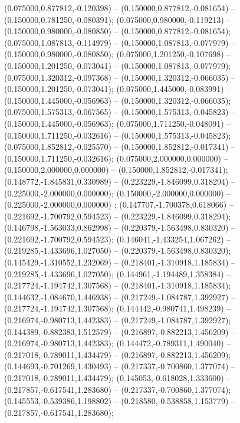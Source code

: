  (0.075000,0.877812,-0.120398) -- (0.150000,0.877812,-0.081654) -- (0.150000,0.781250,-0.080391);
 (0.075000,0.980000,-0.119213) -- (0.150000,0.980000,-0.080850) -- (0.150000,0.877812,-0.081654);
 (0.075000,1.087813,-0.114979) -- (0.150000,1.087813,-0.077979) -- (0.150000,0.980000,-0.080850);
 (0.075000,1.201250,-0.107698) -- (0.150000,1.201250,-0.073041) -- (0.150000,1.087813,-0.077979);
 (0.075000,1.320312,-0.097368) -- (0.150000,1.320312,-0.066035) -- (0.150000,1.201250,-0.073041);
 (0.075000,1.445000,-0.083991) -- (0.150000,1.445000,-0.056963) -- (0.150000,1.320312,-0.066035);
 (0.075000,1.575313,-0.067565) -- (0.150000,1.575313,-0.045823) -- (0.150000,1.445000,-0.056963);
 (0.075000,1.711250,-0.048091) -- (0.150000,1.711250,-0.032616) -- (0.150000,1.575313,-0.045823);
 (0.075000,1.852812,-0.025570) -- (0.150000,1.852812,-0.017341) -- (0.150000,1.711250,-0.032616);
 (0.075000,2.000000,0.000000) -- (0.150000,2.000000,0.000000) -- (0.150000,1.852812,-0.017341);
 (0.148772,-1.845831,0.330989) -- (0.223229,-1.846099,0.318294) -- (0.225000,-2.000000,0.000000);
 (0.150000,-2.000000,0.000000) -- (0.225000,-2.000000,0.000000) ;
 (0.147707,-1.700378,0.618066) -- (0.221692,-1.700792,0.594523) -- (0.223229,-1.846099,0.318294);
 (0.146798,-1.563033,0.862998) -- (0.220379,-1.563498,0.830320) -- (0.221692,-1.700792,0.594523);
 (0.146041,-1.433254,1.067262) -- (0.219285,-1.433696,1.027050) -- (0.220379,-1.563498,0.830320);
 (0.145429,-1.310552,1.232069) -- (0.218401,-1.310918,1.185834) -- (0.219285,-1.433696,1.027050);
 (0.144961,-1.194489,1.358384) -- (0.217724,-1.194742,1.307568) -- (0.218401,-1.310918,1.185834);
 (0.144632,-1.084670,1.446938) -- (0.217249,-1.084787,1.392927) -- (0.217724,-1.194742,1.307568);
 (0.144442,-0.980741,1.498239) -- (0.216974,-0.980713,1.442383) -- (0.217249,-1.084787,1.392927);
 (0.144389,-0.882383,1.512579) -- (0.216897,-0.882213,1.456209) -- (0.216974,-0.980713,1.442383);
 (0.144472,-0.789311,1.490040) -- (0.217018,-0.789011,1.434479) -- (0.216897,-0.882213,1.456209);
 (0.144693,-0.701269,1.430493) -- (0.217337,-0.700860,1.377074) -- (0.217018,-0.789011,1.434479);
 (0.145053,-0.618028,1.333600) -- (0.217857,-0.617541,1.283680) -- (0.217337,-0.700860,1.377074);
 (0.145553,-0.539386,1.198802) -- (0.218580,-0.538858,1.153779) -- (0.217857,-0.617541,1.283680);
